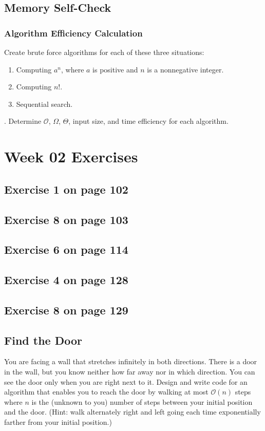 \documentclass[12pt]{amsart}
\begin{document}
\subsection{Memory Self-Check}

\subsubsection{Algorithm Efficiency Calculation}

Create brute force algorithms for each of these three situations:
\begin{enumerate}
     \item Computing $a^n$, where $a$ is positive and $n$ is a nonnegative integer.
     \item Computing $n!$.
     \item Sequential search.
\end{enumerate}.
Determine $\mathcal{O}$, $\Omega$, $\Theta$, input size, and time efficiency for each algorithm. 



\section{Week 02 Exercises}
\subsection{ Exercise 1 on page 102} 
\subsection{Exercise 8 on page 103} 
\subsection{Exercise 6 on page 114} 
\subsection{Exercise 4 on page 128} 
\subsection{Exercise 8 on page 129}
\subsection{Find the Door}
You are facing a wall that stretches infinitely in both directions. There is a door in the wall, but you know neither how far away nor in which direction. You can see the door only when you are right next to it. Design and write code for an algorithm that enables you to reach the door by walking at most $\mathcal{O}(n)$  steps where $n$ is the (unknown to you) number of steps between your initial position and the door. (Hint: walk alternately right and left going each time exponentially farther from your initial position.)
\end{document}
